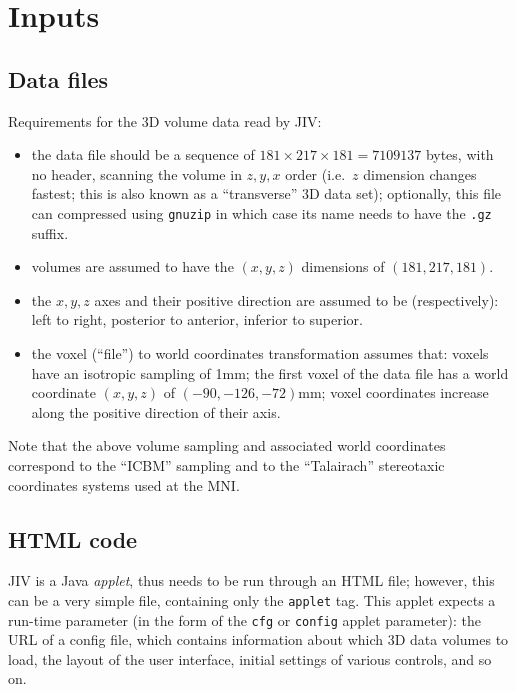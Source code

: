 %
%
%

\section{Inputs}
\label{sec:inputs}


\subsection{Data files}
\label{sec:data-files}
Requirements for the 3D volume data read by JIV:
\begin{itemize}
\item the data file should be a sequence of $181 \times 217 \times 181
  = 7109137$ bytes, with no header, scanning the volume in $z, y, x$
  order (i.e.\ $z$ dimension changes fastest; this is also known as a
  ``transverse'' 3D data set); optionally, this file can compressed
  using \texttt{gnuzip} in which case its name needs to have the
  \texttt{.gz} suffix.
\item volumes are assumed to have the $(x,y,z)$ dimensions of
  $(181,217,181)$.
\item the $x, y, z$ axes and their positive direction are assumed to
  be (respectively): left to right, posterior to anterior, inferior to
  superior.
\item the voxel (``file'') to world coordinates transformation assumes
  that: voxels have an isotropic sampling of 1mm; the first voxel of
  the data file has a world coordinate $(x,y,z)$ of
  \mbox{$(-90,-126,-72)$mm}; voxel coordinates increase along the
  positive direction of their axis.
\end{itemize}

Note that the above volume sampling and associated world coordinates
correspond to the ``ICBM'' sampling and to the ``Talairach''
stereotaxic coordinates systems used at the MNI.  


\subsection{HTML code}
\label{sec:html-code}

JIV is a Java {\em applet}, thus needs to be run through an HTML file;
however, this can be a very simple file, containing only the
\verb+applet+ tag.  This applet expects a run-time parameter (in the
form of the \verb+cfg+ or \verb+config+ applet parameter): the URL of
a config file, which contains information about which 3D data volumes
to load, the layout of the user interface, initial settings of various
controls, and so on.


